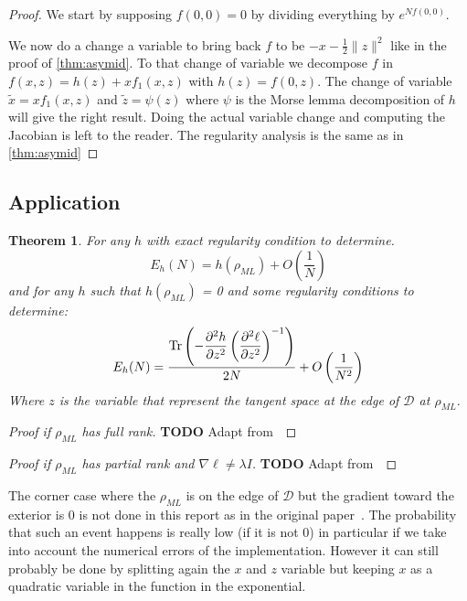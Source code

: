 \documentclass[10pt]{report}
\theoremstyle{plain}
\newtheorem{thm}{Theorem}[chapter]
\theoremstyle{definition}
\theoremstyle{remark}
\newcommand{\TODO}{\textbf{TODO}}
\newcommand{\dparn}[3]{\frac{\partial^{#3} {#1}}{\partial{#2}^{#3}}}
\DeclareMathOperator{\Tr}{Tr}
\newcommand{\ml}{_{M\!L}}
\begin{document}
\begin{proof}
  We start by supposing $f(0,0) = 0$ by dividing everything by $e^{Nf(0,0)}$.

  We now do a change a variable to bring back $f$ to be $-x -\frac12\|z\|^2$ like in
  the proof of \cref{thm:asymid}.
  To that change of variable we decompose $f$ in $f(x,z) = h(z) + xf_1(x,z)$
  with $h(z) = f(0,z)$. The change of variable $\tilde x = xf_1(x,z)$ and
  $\tilde z = \psi(z)$ where $\psi$ is the Morse lemma decomposition of $h$ will
  give the right result. Doing the actual variable change and computing the
  Jacobian is left to the reader.
  The regularity analysis is the same as in \cref{thm:asymid}
\end{proof}



\subsection{Application}


\begin{thm}
  For any $h$ with exact regularity condition to determine.
  \[E_h(N) = h(\rho\ml) + O\left(\frac 1N\right)\]
  and for any $h$ such that $h(\rho\ml)$ = 0 and some regularity conditions to determine:
  \[E_h(N) = \frac{\displaystyle \Tr \left( - \dparn h z 2  \left( \dparn \ell z
        2\right)\inv\right)}{2N} + O\left(\frac 1 {N^2}\right)\]
  Where $z$ is the variable that represent the tangent space at the edge of
  $\mathcal{D}$ at $\rho\ml$.
\end{thm}

\begin{proof}[Proof if $\rho\ml$ has full rank]
\TODO{} Adapt from~\cite{SPRAL17}
\end{proof}

\begin{proof}[Proof if $\rho\ml$ has partial rank and $\nabla \ell \neq \lambda I$]
\TODO{} Adapt from~\cite{SPRAL17}
\end{proof}

The corner case where the $\rho\ml$ is on the edge of $\mathcal{D}$ but the
gradient toward the exterior is 0 is not done in this report as in the original
paper~\cite{SPRAL17}. The probability that such an event happens is really low
(if it is not 0) in particular if we take into account the numerical errors of
the implementation. However it can still probably be done by splitting again the
$x$ and $z$ variable but keeping $x$ as a quadratic variable in the function in
the exponential.
\end{document}
